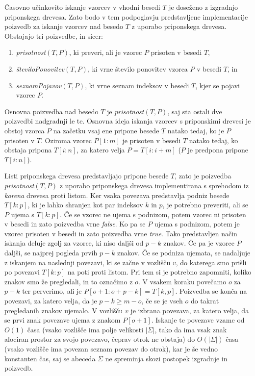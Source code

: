Časovno učinkovito iskanje vzorcev v vhodni besedi $T$ je doseženo z izgradnjo priponskega drevesa. Zato bodo v tem podpoglavju predstavljene implementacije poizvedb za iskanje vzorcev nad besedo $T$ z uporabo priponskega drevesa. Obstajajo tri poizvedbe, in sicer:
\begin{enumerate}
    \item \textit{prisotnost}$(T,P)$, ki preveri, ali je vzorec $P$ prisoten v besedi $T$,
    \item \textit{številoPonovitev}$(T,P)$, ki vrne število ponovitev vzorca $P$ v besedi $T$, in
    \item \textit{seznamPojavov}$(T,P)$, ki vrne seznam indeksov v besedi $T$, kjer se pojavi vzorec $P$.
\end{enumerate}

Osnovna poizvedba nad besedo $T$ je \textit{prisotnost}$(T,P)$, saj sta ostali dve poizvedbi nadgradnji le te. Osnovna ideja iskanja vzorcev s priponskimi drevesi je obstoj vzorca $P$ na začetku vsaj ene pripone besede $T$ natako tedaj, ko je $P$ prisoten v $T$. Oziroma vzorec $P[1:m]$ je prisoten v besedi $T$ natako tedaj, ko obstaja pripona $T[i:n]$, za katero velja $P=T[i:i+m]$ ($P$ je predpona pripone $T[i:n]$). 

Listi priponskega drevesa predstavljajo pripone besede $T$, zato je poizvedba \textit{prisotnost}$(T,P)$ z uporabo priponskega drevesa implementirana s sprehodom iz \textit{korena} drevesa proti listom. Ker vsaka povezava predstavlja podniz besede $T[k:p]$, ki je lahko shranjen kot par indeksov $k$ in $p$, je potrebno preveriti, ali se $P$ ujema s $T[k:p]$. Če se vzorec ne ujema s podnizom, potem vzorec ni prisoten v besedi in zato poizvedba vrne \textit{false}. Ko pa se $P$ ujema s podnizom, potem je vzorec prisoten v besedi in zato poizvedba vrne \textit{true}. Tako predstavljen način iskanja deluje zgolj za vzorce, ki niso daljši od $p-k$ znakov. Če pa je vzorec $P$ daljši, se najprej pogleda prvih $p-k$ znakov. Če se podniza ujemata, se nadaljuje z iskanjem na naslednji povezavi, ki se začne v vozlišču $v$, do katerega smo prišli po povezavi $T[k:p]$ na poti proti listom. Pri tem si je potrebno zapomniti, koliko znakov smo že pregledali, in to označimo z $o$. V vsakem koraku povečamo $o$ za $p-k$ ter perverimo, ali je $P[o+1:o+p-k]=T[k,p]$. Poizvedba se konča na povezavi, za katero velja, da je $p-k\ge m-o$, če se je vseh $o$ do takrat pregledanih znakov ujemalo. V vozlišču $v$ je izbrana povezava, za katero velja, da se prvi znak povezave ujema z znakom $P[o+1]$. Iskanje te povezave vzame od $O(1)$ časa (vsako vozlišče ima polje velikosti $|\Sigma|$, tako da ima vsak znak alociran prostor za svojo povezavo, čeprav otrok ne obstaja) do $O(|\Sigma|)$ časa (vsako vozlišče ima povezan seznam povezav do otrok), kar je še vedno konstanten čas, saj se abeceda $\Sigma$ ne spreminja skozi postopek izgradnje in poizvedb.

